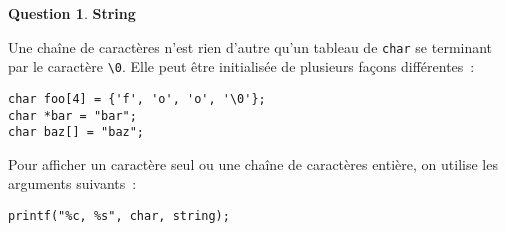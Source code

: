 \documentclass[11pt,a4paper,dvipsnames]{article}
\theoremstyle{definition}%
\newtheorem{Q}{Question}[] %
\begin{document}
\begin{Q} \textbf{String}

Une chaîne de caractères n'est rien d'autre qu'un tableau de \texttt{char} se terminant par le caractère \texttt{\textbackslash0}.
Elle peut être initialisée de plusieurs façons différentes~:

\begin{verbatim}
char foo[4] = {'f', 'o', 'o', '\0'};
char *bar = "bar";
char baz[] = "baz";
\end{verbatim}

Pour afficher un caractère seul ou une chaîne de caractères entière, on utilise les arguments suivants~:
\begin{verbatim}
printf("%c, %s", char, string);
\end{verbatim}
\end{Q}
\end{document}
